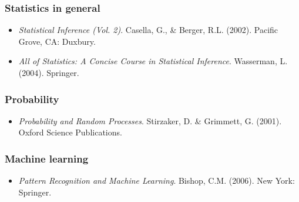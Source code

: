 \documentclass[12pt]{article}
\begin{document}
\subsubsection*{Statistics in general}
\begin{itemize}
\item[] \textit{Statistical Inference (Vol. 2)}. Casella, G., \& Berger, R.L. (2002). Pacific Grove, CA: Duxbury.
\item[] \textit{All of Statistics: A Concise Course in Statistical Inference}. Wasserman, L. (2004). Springer.
\end{itemize}

\subsubsection*{Probability}
\begin{itemize}
\item[] \textit{Probability and Random Processes}. Stirzaker, D. \& Grimmett, G. (2001). Oxford Science Publications.
\end{itemize}

\subsubsection*{Machine learning}
\begin{itemize}
\item[] \textit{Pattern Recognition and Machine Learning}. Bishop, C.M. (2006). New York: Springer.
\end{itemize}
\end{document}
